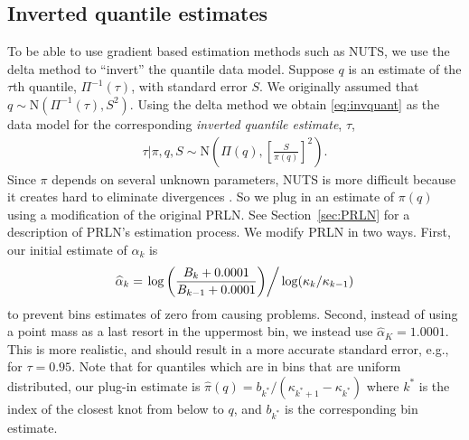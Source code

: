 \documentclass[12pt]{article}
\begin{document}
\subsection{Inverted quantile estimates}\label{sec:inverted.quantile}
To be able to use gradient based estimation methods such as NUTS, we use the delta method to ``invert'' the quantile data model. Suppose $q$ is an estimate of the $\tau$th quantile, $\Pi^{-1}(\tau)$, with standard error $S$. We originally assumed that $q \sim \mathrm{N}(\Pi^{-1}(\tau), S^2)$. Using the delta method we obtain \eqref{eq:invquant} as the data model for the corresponding \emph{inverted quantile estimate}, $\tau$,
\begin{align}
\tau | \pi, q, S \sim \mathrm{N}\left(\Pi(q), \left[\frac{S}{\pi(q)}\right]^2\right). \label{eq:invquant}
\end{align}
Since $\pi$ depends on several unknown parameters, NUTS is more difficult because it creates hard to eliminate divergences \citep[see e.g.][]{betancourt2015hamiltonian}. So we plug in an estimate of $\pi(q)$ using a modification of the original PRLN. See Section~\ref{sec:PRLN} for a description of PRLN's estimation process. We modify PRLN in two ways. First, our initial estimate of $\alpha_k$ is
\begin{align*}
\widehat{\alpha}_k = \left.\log\left(\frac{B_k + 0.0001}{B_{k-1} + 0.0001}\right) \right/ \log(\kappa_k / \kappa_{k-1}) 
\end{align*}
to prevent bins estimates of zero from causing problems. Second, instead of using a point mass as a last resort in the uppermost bin, we instead use $\widehat{\alpha}_K = 1.0001$. This is more realistic, and should result in a more accurate standard error, e.g., for $\tau = 0.95$. Note that for quantiles which are in bins that are uniform distributed, our plug-in estimate is $\widehat{\pi}(q) = b_{k^*} / (\kappa_{k^* + 1} - \kappa_{k^*})$ where $k^*$ is the index of the closest knot from below to $q$, and $b_{k^*}$ is the corresponding bin estimate.
\end{document}
